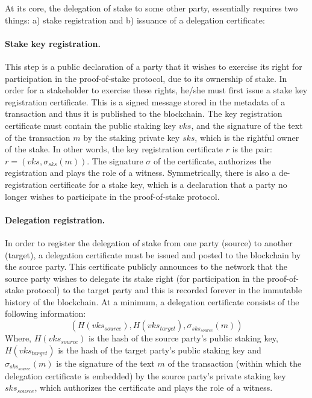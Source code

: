 At its core, the delegation of stake to some other party, essentially requires two things: a) stake registration and b) issuance of a delegation certificate:

\paragraph{Stake key registration.}
This step is a public declaration of a party that it wishes to exercise its right for participation in the proof-of-stake protocol, due to its ownership of stake. In order for a stakeholder to exercise these rights, he/she must first issue a stake key registration certificate. This is a signed message stored in the metadata of a transaction and thus it is published to the blockchain. The key registration certificate must contain the public staking key $vks$, and the signature of the text of the transaction $m$ by the staking private key $sks$, which is the rightful owner of the stake. In other words, the key registration certificate $r$ is the pair: $r = (vks, \sigma_{sks}(m))$. The signature $\sigma$ of the certificate, authorizes the registration and  plays the role of a witness. 
Symmetrically, there is also a de-registration certificate for a stake key, which is a declaration that a party no longer wishes to participate in the proof-of-stake protocol.

\paragraph{Delegation registration.} 
In order to register the delegation of stake from one party (source) to another (target), a delegation certificate must be issued and posted to the blockchain by the source party. This certificate publicly announces to the network that the source party wishes to delegate its stake right (for participation in the proof-of-stake protocol) to the target party and this is recorded forever in the immutable history of the blockchain. 
At a minimum, a delegation certificate consists of the following information:
$$
(H(vks_{source}), H(vks_{target}), \sigma_{sks_{source}}(m))
$$ 
Where, $H(vks_{source})$ is the hash of the source party's public staking key, $H(vks_{target})$ is the hash of the target party's public staking key and $\sigma_{sks_{source}}(m)$ is the signature of the text $m$ of the transaction (within which the delegation certificate is embedded) by the source party's private staking key $sks_{source}$, which authorizes the certificate and plays the role of a witness.

